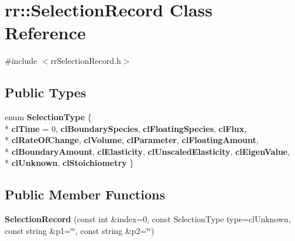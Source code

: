 \hypertarget{classrr_1_1_selection_record}{\section{rr\-:\-:Selection\-Record Class Reference}
\label{classrr_1_1_selection_record}
}


{\ttfamily \#include $<$rr\-Selection\-Record.\-h$>$}

\subsection*{Public Types}
\begin{DoxyCompactItemize}
\item 
enum {\bfseries Selection\-Type} \{ \\*
{\bfseries cl\-Time} = 0, 
{\bfseries cl\-Boundary\-Species}, 
{\bfseries cl\-Floating\-Species}, 
{\bfseries cl\-Flux}, 
\\*
{\bfseries cl\-Rate\-Of\-Change}, 
{\bfseries cl\-Volume}, 
{\bfseries cl\-Parameter}, 
{\bfseries cl\-Floating\-Amount}, 
\\*
{\bfseries cl\-Boundary\-Amount}, 
{\bfseries cl\-Elasticity}, 
{\bfseries cl\-Unscaled\-Elasticity}, 
{\bfseries cl\-Eigen\-Value}, 
\\*
{\bfseries cl\-Unknown}, 
{\bfseries cl\-Stoichiometry}
 \}
\end{DoxyCompactItemize}
\subsection*{Public Member Functions}
\begin{DoxyCompactItemize}
\item 
\hypertarget{classrr_1_1_selection_record_a34f08382c4a849ab3e541b0a494768f0}{{\bfseries Selection\-Record} (const int \&index=0, const Selection\-Type type=cl\-Unknown, const string \&p1=\char`\"{}\char`\"{}, const string \&p2=\char`\"{}\char`\"{})}\label{classrr_1_1_selection_record_a34f08382c4a849ab3e541b0a494768f0}

\end{DoxyCompactItemize}
